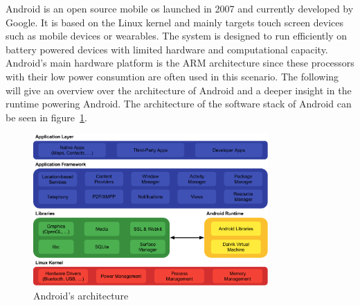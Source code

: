 
Android is an open source mobile \gls{os} launched in 2007 and currently developed by Google.
It is based on the Linux kernel and mainly targets touch screen devices such as mobile devices or wearables.
The system is designed to run efficiently on battery powered devices with limited hardware and computational capacity.
Android's main hardware platform is the ARM architecture since these processors with their low power consumtion are often used in this scenario.
The following will give an overview over the architecture of Android and a deeper insight in the runtime powering Android.
The architecture of the software stack of Android can be seen in figure~\ref{fig:androidArchitecture}.
\newline

\begin{figure}[h]
    \centering
    \includegraphics[width=0.8\textwidth]{data/stack.png}
    \caption{Android's architecture \cite{androidStack}}
    \label{fig:androidArchitecture}
\end{figure}

